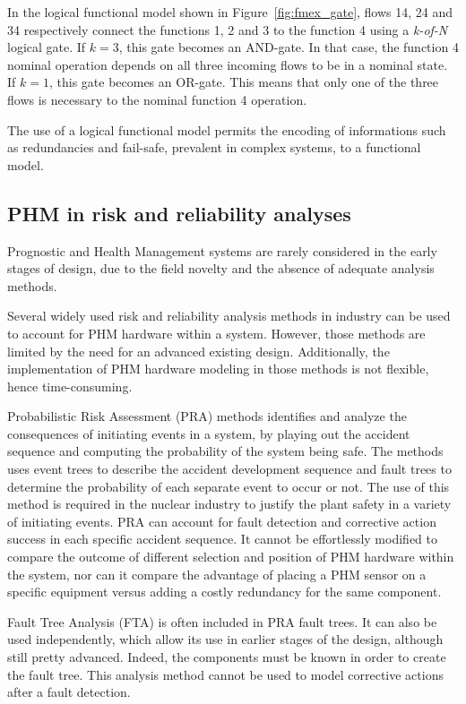 In the logical functional model shown in Figure~\ref{fig:fmex_gate}, flows 14, 24 and 34 respectively connect the functions 1, 2 and 3 to the function 4 using a \textit{k-of-N} logical gate. If $k = 3$, this gate becomes an AND-gate. In that case, the function 4 nominal operation depends on all three incoming flows to be in a nominal state. If $k = 1$, this gate becomes an OR-gate. This means that only one of the three flows is necessary to the nominal function 4 operation.

The use of a logical functional model permits the encoding of informations such as redundancies and fail-safe, prevalent in complex systems, to a functional model.


\subsection{PHM in risk and reliability analyses}

Prognostic and Health Management systems are rarely considered in the early stages of design, due to the field novelty and the absence of adequate analysis methods.

Several widely used risk and reliability analysis methods in industry can be used to account for PHM hardware within a system. However, those methods are limited by the need for an advanced existing design. Additionally, the implementation of PHM hardware modeling in those methods is not flexible, hence time-consuming.

Probabilistic Risk Assessment (PRA) methods identifies and analyze the consequences of initiating events in a system, by playing out the accident sequence and computing the probability of the system being safe. The methods uses event trees to describe the accident development sequence and fault trees to determine the probability of each separate event to occur or not. The use of this method is required in the nuclear industry to justify the plant safety in a variety of initiating events. PRA can account for fault detection and corrective action success in each specific accident sequence. It cannot be effortlessly modified to compare the outcome of different selection and position of PHM hardware within the system, nor can it compare the advantage of placing a PHM sensor on a specific equipment versus adding a costly redundancy for the same component.

Fault Tree Analysis (FTA) is often included in PRA fault trees. It can also be used independently, which allow its use in earlier stages of the design, although still pretty advanced. Indeed, the components must be known in order to create the fault tree. This analysis method cannot be used to model corrective actions after a fault detection.

